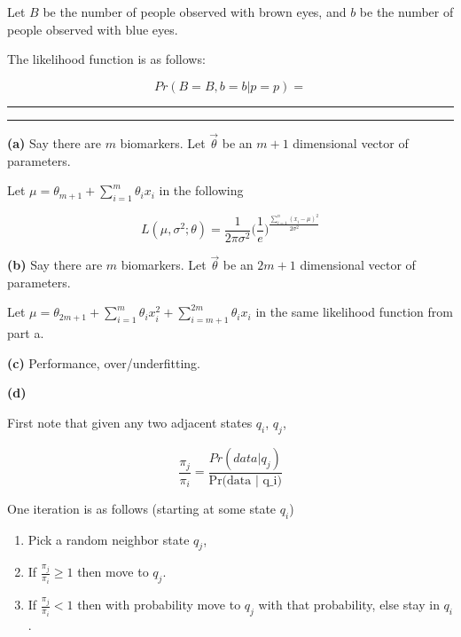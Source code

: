 \documentclass[11pt,letterpaper]{article}
\newcommand{\question}[1] {\vspace{.25in} \hrule\vspace{0.5em}
\noindent{\bf #1} \vspace{0.5em}
\hrule \vspace{.10in}}
\renewcommand{\part}[1] {\vspace{.10in} {\bf (#1)}}
\begin{document}
Let $B$ be the number of people observed with brown eyes,
and $b$ be the number of people observed with blue eyes.

The likelihood function is as follows:

$$Pr(B=B, b=b | p=p) = $$

\question{2}

\part{a}
Say there are $m$ biomarkers. Let $\vec{\theta}$ be an $m+1$ dimensional vector of parameters.

Let $\mu =  \theta_{m+1} + \sum_{i=1}^{m} \theta_i x_i $ in the following

$$L(\mu, \sigma^2; \theta) = \frac{1}{2\pi\sigma^2} \bigg(\frac{1}{e}\bigg)^\frac{\sum_{i=1}^{n} (x_i-\mu)^2}{2\sigma^2}$$

\part{b}
Say there are $m$ biomarkers. Let $\vec{\theta}$ be an $2m+1$ dimensional vector of parameters.

Let $\mu =  \theta_{2m+1} + \sum_{i=1}^{m} \theta_i x_i^2 + \sum_{i=m+1}^{2m} \theta_i x_i $ in the same likelihood function from part a.

\part{c}
Performance, over/underfitting.

\part{d}

First note that given any two adjacent states $q_i$, $q_j$,

$$\frac{\pi_j}{\pi_i} = \frac{Pr(data | q_j)}{\text{Pr(data | q_i)}}$$

One iteration is as follows (starting at some state $q_i$)

\begin{enumerate}
\item Pick a random neighbor state $q_j$,
\item If $\frac{\pi_j}{\pi_i} \geq 1$ then move to $q_j$.
\item If $\frac{\pi_j}{\pi_i} < 1$ then with probability move to $q_j$ with that probability, else stay in $q_i$.
\end{enumerate}
\end{document}
